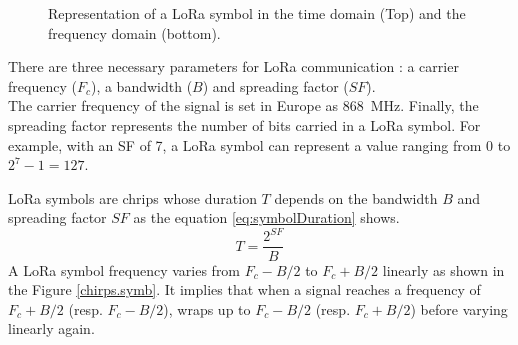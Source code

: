 \documentclass[a4paper, 12pt]{article}
\begin{document}
\begin{figure}[ht]
  \begin{center}
    
  \end{center}
  \caption{Representation of a LoRa symbol in the time domain (Top) and the frequency domain (bottom).}\label{fig:timeVsFreq}
\end{figure}

There are three necessary parameters for LoRa communication : a carrier frequency ($F_c$), a bandwidth ($B$) and spreading factor ($SF$).\\
The carrier frequency of the signal is set in Europe as \qty{868}{\mega\hertz}.
Finally, the spreading factor represents the number of bits carried in a LoRa symbol. For example, with an SF of 7, a LoRa symbol can represent a value ranging from 0 to $2^7 -1 = 127$.

LoRa symbols are chrips whose duration $T$ depends on the bandwidth $B$ and spreading factor $SF$ as the equation \ref{eq:symbolDuration} shows. 
\begin{equation}
  T = \frac{2^{SF}}{B} 
  \label{eq:symbolDuration}
\end{equation}
A LoRa symbol frequency varies from $F_c - B/2$ to $F_c + B/2$ linearly as shown in the Figure \ref{chirps.symb}. It implies that when a signal reaches a frequency of $F_c + B/2$ (resp. $F_c -B/2$), wraps up to $F_c - B/2$ (resp. $F_c + B/2$) before varying linearly again.
\end{document}
